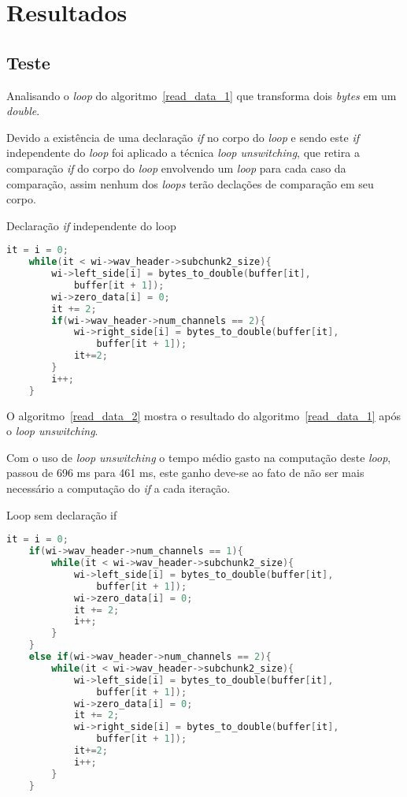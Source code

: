 
\chapter{Resultados}

\section{Teste}
Analisando o \textit{loop} do algoritmo~\ref{read_data_1} que 
transforma dois \textit{bytes} em um \textit{double}.

Devido a existência de uma declaração \textit{if} no corpo do \textit{loop} e
sendo este \textit{if} independente do \textit{loop} foi
aplicado a técnica \textit{loop unswitching}, que retira a comparação
\textit{if} do corpo do \textit{loop} envolvendo um \textit{loop} para cada caso
da comparação, assim nenhum dos \textit{loops} terão declações de comparação em seu
corpo.

\begin{algorithm}
    \caption{Declaração \textit{if} independente do loop}
    \label{read_data_1}
    \begin{lstlisting}[language=c]
    it = i = 0;
    while(it < wi->wav_header->subchunk2_size){
        wi->left_side[i] = bytes_to_double(buffer[it],
            buffer[it + 1]);
        wi->zero_data[i] = 0;
        it += 2;
        if(wi->wav_header->num_channels == 2){
            wi->right_side[i] = bytes_to_double(buffer[it],
                buffer[it + 1]);
            it+=2;
        }
        i++;
    }
    \end{lstlisting}
\end{algorithm}

O algoritmo~\ref{read_data_2} mostra o resultado do algoritmo~\ref{read_data_1} 
após o \textit{loop unswitching}.

Com o uso de \textit{loop unswitching} o tempo médio gasto na computação deste
\textit{loop}, passou de 696 ms para 461 ms, este ganho deve-se ao fato de não
ser mais necessário a computação do \textit{if} a cada iteração. 


\begin{algorithm}
    \caption{Loop sem declaração if }
    \label{read_data_2}
    \begin{lstlisting}[language=c]
    it = i = 0;
    if(wi->wav_header->num_channels == 1){
        while(it < wi->wav_header->subchunk2_size){
            wi->left_side[i] = bytes_to_double(buffer[it], 
                buffer[it + 1]);
            wi->zero_data[i] = 0;
            it += 2;
            i++;
        }
    }
    else if(wi->wav_header->num_channels == 2){
        while(it < wi->wav_header->subchunk2_size){
            wi->left_side[i] = bytes_to_double(buffer[it], 
                buffer[it + 1]);
            wi->zero_data[i] = 0;
            it += 2;
            wi->right_side[i] = bytes_to_double(buffer[it], 
                buffer[it + 1]);
            it+=2;
            i++;
        }
    }
    \end{lstlisting}
\end{algorithm}

